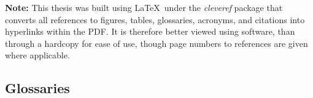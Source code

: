 \documentclass[11pt]{report} %
\begin{document}
\begin{spacing}{1.1}





{\noindent \textbf{Note:} This thesis was built using \LaTeX\  under the \textit{cleveref} package that converts all references to figures, tables, glossaries, acronyms, and citations into hyperlinks within the PDF. It is therefore better viewed using software, than through a hardcopy for ease of use, though page numbers to references are given where applicable.}


	\begin{spacing}{1.2}

	\end{spacing}

\pagebreak
	\begin{spacing}{1.2}
	\tableofcontents
	\end{spacing}
\end{spacing}

\endgroup





\pagebreak







\begin{spacing}{1}

\addtocounter{chapter}{1}
\pagebreak
{}





\appendix

\pagebreak
\chapter{Glossaries}
\printglossary[type=biol,style=long]
\pagebreak
\printglossary[type=comp,style=long]

\end{spacing}


\end{document}
